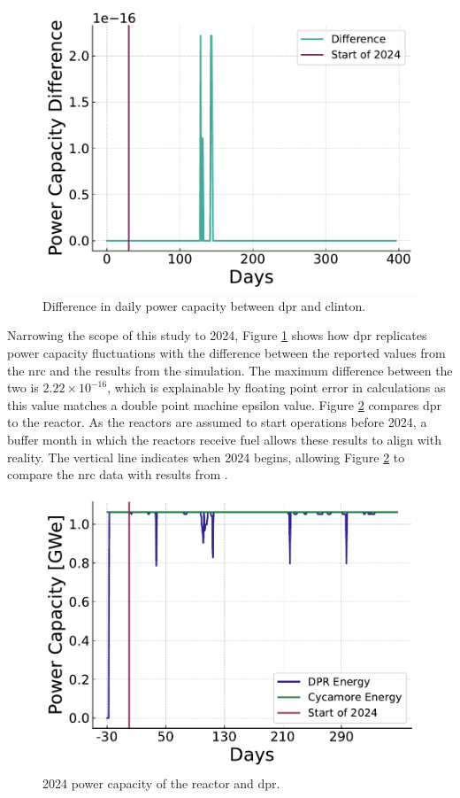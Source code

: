 \begin{figure}[H]
  \centering
  \includegraphics[width=0.7\linewidth]{images/power_reactor/dpr_diff.pdf}
  \caption{Difference in daily power capacity between \gls{dpr} and \gls{clinton}.}
  \label{fig:dpr_clinton_diff}
\end{figure}


Narrowing the scope of this study to 2024, Figure \ref{fig:dpr_clinton_diff} shows how \gls{dpr} replicates power capacity fluctuations with the difference between the reported values from the \gls{nrc} \cite{nrc_power_2025} and the results from the \cyclus simulation. The maximum difference between the two is $2.22 \times 10^{-16}$, which is explainable by floating point error in calculations as this value matches a double point machine epsilon value. Figure \ref{fig:dpr_cycamore_power} compares \gls{dpr} to the \cycamore reactor. As the reactors are assumed to start operations before 2024, a buffer month in which the reactors receive fuel allows these results to align with reality. The vertical line indicates when 2024 begins, allowing Figure \ref{fig:dpr_cycamore_power} to compare the \gls{nrc} data with results from \cyclus.


\begin{figure}[H]
  \centering
  \includegraphics[width=0.7\linewidth]{images/power_reactor/dpr_cycamore_energy.pdf}
  \caption{2024 power capacity of the \cycamore reactor and \gls{dpr}.}
  \label{fig:dpr_cycamore_power}
\end{figure}


